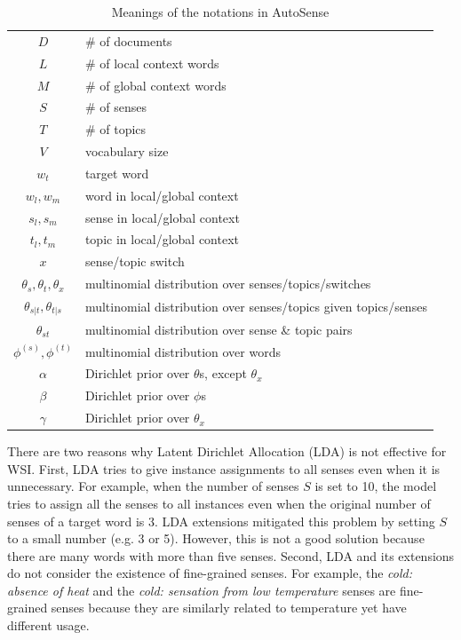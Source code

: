 \documentclass[letterpaper]{article} %
\begin{document}
\begin{table}[t]
    \scriptsize
    \centering
    \begin{tabularx}{0.47\textwidth}{|cX|}
        \hline
        $D$ & \# of documents \\
        $L$ & \# of local context words \\
        $M$ & \# of global context words \\
        $S$ & \# of senses \\
        $T$ & \# of topics \\
        $V$ & vocabulary size \\
        $w_t$ & target word \\
        $w_l,w_m$ & word in local/global context \\
        $s_l,s_m$ & sense in local/global context \\
        $t_l,t_m$ & topic in local/global context \\
        $x$ & sense/topic switch \\
        $\theta_s,\theta_t,\theta_{x}$ & multinomial distribution over senses/topics/switches \\
        $\theta_{s|t},\theta_{t|s}$ & multinomial distribution over senses/topics given topics/senses \\
        $\theta_{st}$ & multinomial distribution over sense \& topic pairs \\
        $\phi^{(s)},\phi^{(t)}$ & multinomial distribution over words \\
        $\alpha$ & Dirichlet prior over $\theta$s, except $\theta_{x}$ \\
        $\beta$ & Dirichlet prior over $\phi$s \\
        $\gamma$ & Dirichlet prior over $\theta_{x}$ \\
        \hline
    \end{tabularx}
    \caption{Meanings of the notations in AutoSense}
    \label{tab:notations}
\end{table}

There are two reasons why Latent Dirichlet Allocation (LDA) \cite{blei2003latent} is not effective for WSI. First, LDA tries to give instance assignments to all senses even when it is unnecessary. For example, when the number of senses $S$ is set to 10, the model tries to assign all the senses to all instances even when the original number of senses of a target word is 3. LDA extensions \cite{wang2015sense,chang2014inducing} mitigated this problem by setting $S$ to a small number (e.g. 3 or 5). However, this is not a good solution because there are many words with more than five senses. Second, LDA and its extensions do not consider the existence of fine-grained senses. For example, the \textit{cold: absence of heat} and the \textit{cold: sensation from low temperature} senses are fine-grained senses because they are similarly related to temperature yet have different usage. %
\end{document}
